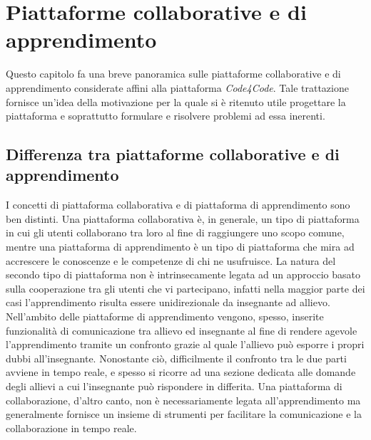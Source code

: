 \chapter{Piattaforme collaborative e di apprendimento} %
%
\begin{citazione}
Questo capitolo fa una breve panoramica sulle piattaforme collaborative e di apprendimento considerate affini alla piattaforma \emph{Code4Code}. Tale trattazione fornisce un'idea della motivazione per la quale si è ritenuto utile progettare la piattaforma e soprattutto formulare e risolvere problemi ad essa inerenti.
\end{citazione}
\newpage

\section{Differenza tra piattaforme collaborative e di apprendimento} %
I concetti di piattaforma collaborativa e di piattaforma di apprendimento sono ben distinti. Una piattaforma collaborativa è, in generale, un tipo di piattaforma in cui gli utenti collaborano tra loro al fine di raggiungere uno scopo comune, mentre una piattaforma di apprendimento è un tipo di piattaforma che mira ad accrescere le conoscenze e le competenze di chi ne usufruisce. La natura del secondo tipo di piattaforma non è intrinsecamente legata ad un approccio basato sulla cooperazione tra gli utenti che vi partecipano, infatti nella maggior parte dei casi l'apprendimento risulta essere unidirezionale da insegnante ad allievo. Nell'ambito delle piattaforme di apprendimento vengono, spesso, inserite funzionalità di comunicazione tra allievo ed insegnante al fine di rendere agevole l'apprendimento tramite un confronto grazie al quale l'allievo può esporre i propri dubbi all'insegnante. Nonostante ciò, difficilmente il confronto tra le due parti avviene in tempo reale, e spesso si ricorre ad una sezione dedicata alle domande degli allievi a cui l'insegnante può rispondere in differita. Una piattaforma di collaborazione, d'altro canto, non è necessariamente legata all'apprendimento ma generalmente fornisce un insieme di strumenti per facilitare la comunicazione e la collaborazione in tempo reale.  
